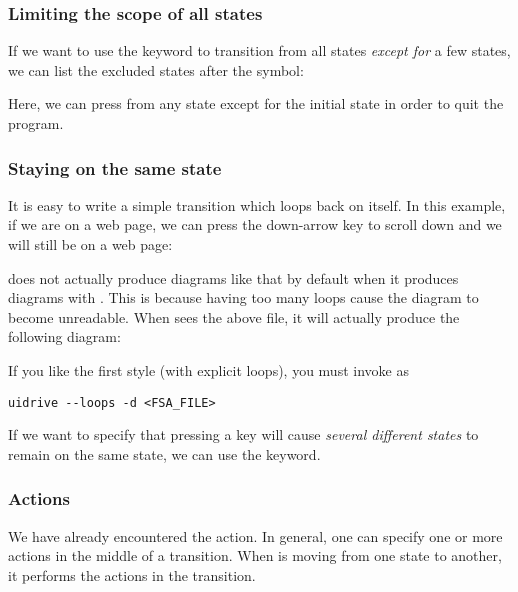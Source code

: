 \documentclass[11pt,a4paper]{article}
\begin{document}
\subsubsection{Limiting the scope of all states}

If we want to use the  keyword to transition from all states
\emph{except for} a few states, we can list the excluded states after
the  symbol:


Here, we can press  from any state except for the initial
state in order to quit the program.

\subsubsection{Staying on the same state\label{sec:stay}}

It is easy to write a simple transition which loops back on itself. In
this example, if we are on a web page, we can press the down-arrow key
to scroll down and we will still be on a web page:


 does not actually produce diagrams like that by default
when it produces diagrams with .  This is because
having too many loops cause the diagram to become unreadable. When
 sees the above  file, it will actually produce
the following
diagram:


If you like the first style (with explicit loops), you must invoke
 as

\begin{lstlisting}
uidrive --loops -d <FSA_FILE>
\end{lstlisting}

If we want to specify that pressing a key will cause \emph{several
different states} to remain on the same state, we can use the
 keyword.


\subsubsection{Actions\label{sec:actions}}

We have already encountered the  action. In general, one can
specify one or more actions in the middle of a transition. When
 is moving from one state to another, it performs the
actions in the transition.
\end{document}
